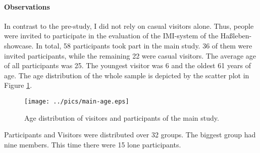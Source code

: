 \paragraph{Observations} In contrast to the pre-study, I did not rely on casual visitors alone. Thus, people were invited to participate in the evaluation of the \ac{IMI}-system of the Haßleben-showcase. In total, 58 participants took part in the main study. 36 of them were invited participants, while the remaining 22 were casual visitors. The average age of all participants was 25. The youngest visitor was 6 and the oldest 61 years of age. The age distribution of the whole sample is depicted by the scatter plot in Figure \ref{fig:main_study_ages}. 
\begin{figure}[H]%
\texttt{[image: ../pics/main-age.eps]}%
\caption{Age distribution of visitors and participants of the main study.}%
\label{fig:main_study_ages} %
\end{figure}

Participants and Visitors were distributed over 32 groups. The biggest group had nine members. This time there were 15 lone participants.

